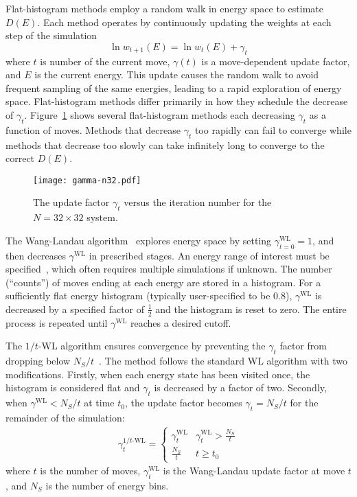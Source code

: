 Flat-histogram methods employ a random walk in energy space to estimate $D(E)$.  Each method operates by continuously updating the weights at each
step of the simulation
\begin{equation}
	\ln{w_{t+1}(E)}=\ln{w_{t}(E)}
	+\gamma_t
\end{equation}
where $t$ is number of the current move, $\gamma(t)$ is a move-dependent update
factor, and $E$ is the current energy.  This update causes the random walk to
avoid frequent sampling of the same energies, leading to a rapid exploration
of energy space. Flat-histogram methods differ primarily in how they schedule
the decrease of $\gamma_t$.  Figure~\ref{fig:N32-gamma} shows several
flat-histogram methods each decreasing $\gamma_t$ as a function of moves.
Methods that decrease $\gamma_t$ too rapidly can fail to converge while methods
that decrease too slowly can take infinitely long to converge to the correct
$D(E)$.

\begin{figure}
\texttt{[image: gamma-n32.pdf]}
  \caption{
  The update factor $\gamma_t$ versus the iteration number for the $N=32 \times 32$
  system.}
  \label{fig:N32-gamma}
\end{figure}

The Wang-Landau algorithm~\cite{wang2001efficient,wang2001determining,
landau2014guide} explores energy space by setting
$\gamma_{t=0}^{\text{WL}}=1$, and then decreases $\gamma^{\text{WL}}$ in prescribed stages. An energy range of
interest must be specified~\cite{wang2001efficient, schulz2003avoiding,yan2003fast}, which often requires multiple simulations if unknown.
%
The number (``counts'') of moves ending at each energy are stored in a
histogram.  For a sufficiently flat energy histogram (typically user-specified to be 0.8), $\gamma^{\text{WL}}$ is decreased by a specified factor of $\frac12$ and the histogram is reset to zero. The entire process is repeated until $\gamma^{\text{WL}}$ reaches a desired cutoff.

The $1/t$-WL algorithm ensures convergence by preventing the $\gamma_t$ factor
from dropping below $N_S/t$~\cite{belardinelli2008analysis,
schneider2017convergence}. The method follows the standard WL algorithm with two
modifications.  Firstly, when each energy state has been visited once, the histogram is considered flat and $\gamma_t$ is
decreased by a factor of two. Secondly, when
$\gamma^{\text{WL}} < N_S/t$ at time $t_0$, the update factor becomes
$\gamma_t = N_S/t$ for the remainder of the simulation:
\begin{align}
  \gamma_t^{1/t\text{-WL}} = \begin{cases}
     \gamma^{\text{WL}}_t & \gamma^{\text{WL}}_t > \frac{N_S}{t} \\
     \frac{N_S}{t} & t \ge t_0
 \end{cases}
\end{align}
where $t$ is the number of moves, $\gamma^{\text{WL}}_t$ is the Wang-Landau update factor
at move $t$, and $N_S$ is the number of energy bins.

